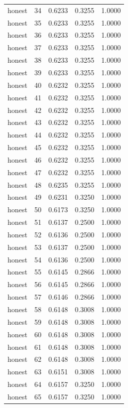\begin{tabular}{lrrrr}
honest & 34 & 0.6233 & 0.3255 & 1.0000 \\
honest & 35 & 0.6233 & 0.3255 & 1.0000 \\
honest & 36 & 0.6233 & 0.3255 & 1.0000 \\
honest & 37 & 0.6233 & 0.3255 & 1.0000 \\
honest & 38 & 0.6233 & 0.3255 & 1.0000 \\
honest & 39 & 0.6233 & 0.3255 & 1.0000 \\
honest & 40 & 0.6232 & 0.3255 & 1.0000 \\
honest & 41 & 0.6232 & 0.3255 & 1.0000 \\
honest & 42 & 0.6232 & 0.3255 & 1.0000 \\
honest & 43 & 0.6232 & 0.3255 & 1.0000 \\
honest & 44 & 0.6232 & 0.3255 & 1.0000 \\
honest & 45 & 0.6232 & 0.3255 & 1.0000 \\
honest & 46 & 0.6232 & 0.3255 & 1.0000 \\
honest & 47 & 0.6232 & 0.3255 & 1.0000 \\
honest & 48 & 0.6235 & 0.3255 & 1.0000 \\
honest & 49 & 0.6231 & 0.3250 & 1.0000 \\
honest & 50 & 0.6173 & 0.3250 & 1.0000 \\
honest & 51 & 0.6137 & 0.2500 & 1.0000 \\
honest & 52 & 0.6136 & 0.2500 & 1.0000 \\
honest & 53 & 0.6137 & 0.2500 & 1.0000 \\
honest & 54 & 0.6136 & 0.2500 & 1.0000 \\
honest & 55 & 0.6145 & 0.2866 & 1.0000 \\
honest & 56 & 0.6145 & 0.2866 & 1.0000 \\
honest & 57 & 0.6146 & 0.2866 & 1.0000 \\
honest & 58 & 0.6148 & 0.3008 & 1.0000 \\
honest & 59 & 0.6148 & 0.3008 & 1.0000 \\
honest & 60 & 0.6148 & 0.3008 & 1.0000 \\
honest & 61 & 0.6148 & 0.3008 & 1.0000 \\
honest & 62 & 0.6148 & 0.3008 & 1.0000 \\
honest & 63 & 0.6151 & 0.3008 & 1.0000 \\
honest & 64 & 0.6157 & 0.3250 & 1.0000 \\
honest & 65 & 0.6157 & 0.3250 & 1.0000 \\

\end{tabular}
